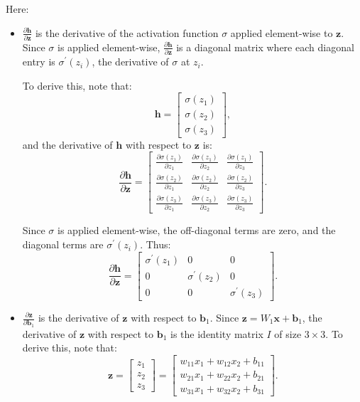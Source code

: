\begin{notechapter}
Here:
\begin{itemize}
    \item \( \frac{\partial \mathbf{h}}{\partial \mathbf{z}} \) is the derivative of the activation function \( \sigma \) applied element-wise to \( \mathbf{z} \). Since \( \sigma \) is applied element-wise, \( \frac{\partial \mathbf{h}}{\partial \mathbf{z}} \) is a diagonal matrix where each diagonal entry is \( \sigma^{\prime}(z_i) \), the derivative of \( \sigma \) at \( z_i \). 

    To derive this, note that:
    \[
    \mathbf{h} = \begin{bmatrix}
    \sigma(z_1) \\
    \sigma(z_2) \\
    \sigma(z_3)
    \end{bmatrix},
    \]
    and the derivative of \( \mathbf{h} \) with respect to \( \mathbf{z} \) is:
    \[
    \frac{\partial \mathbf{h}}{\partial \mathbf{z}} = \begin{bmatrix}
    \frac{\partial \sigma(z_1)}{\partial z_1} & \frac{\partial \sigma(z_1)}{\partial z_2} & \frac{\partial \sigma(z_1)}{\partial z_3} \\
    \frac{\partial \sigma(z_2)}{\partial z_1} & \frac{\partial \sigma(z_2)}{\partial z_2} & \frac{\partial \sigma(z_2)}{\partial z_3} \\
    \frac{\partial \sigma(z_3)}{\partial z_1} & \frac{\partial \sigma(z_3)}{\partial z_2} & \frac{\partial \sigma(z_3)}{\partial z_3}
    \end{bmatrix}.
    \]

    Since \( \sigma \) is applied element-wise, the off-diagonal terms are zero, and the diagonal terms are \( \sigma^{\prime}(z_i) \). Thus:
    \[
    \frac{\partial \mathbf{h}}{\partial \mathbf{z}} = \begin{bmatrix}
    \sigma^{\prime}(z_1) & 0 & 0 \\
    0 & \sigma^{\prime}(z_2) & 0 \\
    0 & 0 & \sigma^{\prime}(z_3)
    \end{bmatrix}.
    \]

    \item \( \frac{\partial \mathbf{z}}{\partial \mathbf{b}_1} \) is the derivative of \( \mathbf{z} \) with respect to \( \mathbf{b}_1 \). Since \( \mathbf{z} = W_1 \mathbf{x} + \mathbf{b}_1 \), the derivative of \( \mathbf{z} \) with respect to \( \mathbf{b}_1 \) is the identity matrix \( I \) of size \( 3 \times 3 \). To derive this, note that:
    \[
    \mathbf{z} = \begin{bmatrix}
    z_1 \\
    z_2 \\
    z_3
    \end{bmatrix} = \begin{bmatrix}
    w_{11}x_1 + w_{12}x_2 + b_{11} \\
    w_{21}x_1 + w_{22}x_2 + b_{21} \\
    w_{31}x_1 + w_{32}x_2 + b_{31}
    \end{bmatrix}.
    \]


\end{itemize}
\end{notechapter}
